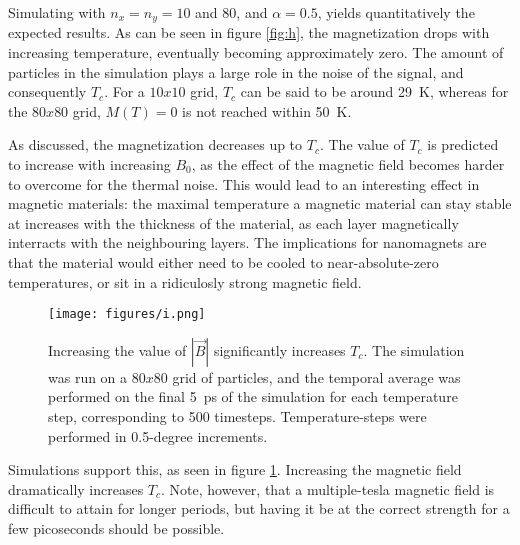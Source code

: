 Simulating with $n_x = n_y = 10$ and $80$, and $\alpha = 0.5$, yields quantitatively the expected results.
As can be seen in figure \ref{fig:h}, the magnetization drops with increasing temperature, 
eventually becoming approximately zero. 
The amount of particles in the simulation plays a large role in the noise of the signal, 
and consequently $T_c$. For a $10x10$ grid, $T_c$ can be said to be around \SI{29}{\kelvin},
whereas for the $80x80$ grid, $M(T)=0$ is not reached within \SI{50}{\kelvin}.

As discussed, the magnetization decreases up to $T_c$. 
The value of $T_c$ is predicted to increase with increasing $B_0$, 
as the effect of the magnetic field becomes harder to overcome for the thermal noise.
This would lead to an interesting effect in magnetic materials: 
the maximal temperature a magnetic material can stay stable at increases 
with the thickness of the material, 
as each layer magnetically interracts with the neighbouring layers.
The implications for nanomagnets are that the material would either need to be 
cooled to near-absolute-zero temperatures, or sit in a ridiculosly strong magnetic field.

\begin{figure}
    \centering
    \texttt{[image: figures/i.png]}
    \caption{
        Increasing the value of $|\vec{B}|$ significantly increases $T_c$.
        The simulation was run on a $80x80$ grid of particles, and the temporal
        average was performed on the final \SI{5}{\pico\second} of the simulation
        for each temperature step, corresponding to 500 timesteps. 
        Temperature-steps were performed in 0.5-degree increments.
    }
    \label{fig:i}
\end{figure}

Simulations support this, as seen in figure \ref{fig:i}. 
Increasing the magnetic field dramatically increases $T_c$. 
Note, however, that a multiple-tesla magnetic field is difficult to attain for longer periods,
but having it be at the correct strength for a few picoseconds should be possible.

